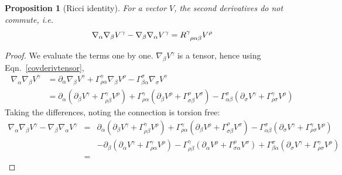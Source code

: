 \documentclass[a4paper]{article}
\theoremstyle{new}
\newtheorem{prop}{Proposition}[section]
\begin{document}
\begin{prop}[Ricci identity]
For a vector $V$, the second derivatives do not commute, i.e.
\begin{equation}
\nabla_\alpha\nabla_\beta V^\gamma-\nabla_\beta\nabla_\alpha V^\gamma=\tensor*{R}{*_{}^{\gamma}_{\rho\alpha\beta}}V^\rho\label{Ricci_identity}
\end{equation}
\end{prop}
\begin{proof}
We evaluate the terms one by one. $\nabla_\beta V^\gamma$ is a tensor, hence using Eqn.~\ref{covderivtensor},
\begin{align}
\nabla_\alpha\nabla_\beta V^\gamma&=\partial_\alpha\nabla_\beta V^\gamma+\Gamma^\gamma_{\rho\alpha}\nabla_\beta V^\rho-\Gamma_{\beta\alpha}^\sigma\nabla_\sigma V^\gamma\nonumber\\&=\partial_\alpha(\partial_\beta V^\gamma+\Gamma^\gamma_{\rho\beta}V^\rho)+\Gamma_{\rho\alpha}^\gamma(\partial_\beta V^\rho+\Gamma_{\sigma\beta}^\rho V^\sigma)-\Gamma_{\alpha\beta}^\sigma(\partial_\sigma V^\gamma+\Gamma^\gamma_{\rho\sigma}V^\rho)\nonumber
\end{align}
Taking the differences, noting the connection is torsion free:
\begin{eqnarray}
\nabla_\alpha\nabla_\beta V^\gamma-\nabla_\beta\nabla_\alpha V^\gamma&=&\partial_\alpha(\partial_\beta V^\gamma+\Gamma^\gamma_{\rho\beta}V^\rho)+\Gamma_{\rho\alpha}^\gamma(\partial_\beta V^\rho+\Gamma_{\sigma\beta}^\rho V^\sigma)-\Gamma_{\alpha\beta}^\sigma(\partial_\sigma V^\gamma+\Gamma^\gamma_{\rho\sigma}V^\rho)\nonumber\\&&-\partial_\beta(\partial_\alpha V^\gamma+\Gamma^\gamma_{\rho\alpha}V^\rho)-\Gamma_{\rho\beta}^\gamma(\partial_\alpha V^\rho+\Gamma_{\sigma\alpha}^\rho V^\sigma)+\Gamma_{\beta\alpha}^\sigma(\partial_\sigma V^\gamma+\Gamma^\gamma_{\rho\sigma}V^\rho)\nonumber\\&=&

\end{eqnarray}
\end{proof}
\end{document}
